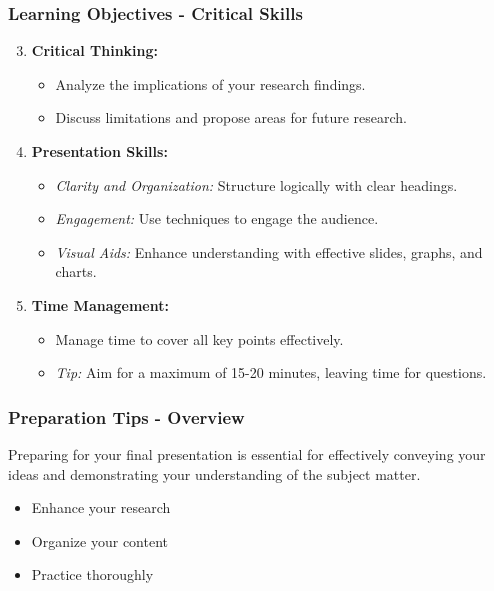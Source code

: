 \documentclass[aspectratio=169]{beamer}
\begin{document}
\begin{frame}[fragile]
    \frametitle{Learning Objectives - Critical Skills}
    \begin{enumerate}
        \setcounter{enumi}{2} %
        \item \textbf{Critical Thinking:}
        \begin{itemize}
            \item Analyze the implications of your research findings.
            \item Discuss limitations and propose areas for future research.
        \end{itemize}

        \item \textbf{Presentation Skills:}
        \begin{itemize}
            \item \textit{Clarity and Organization:} Structure logically with clear headings.
            \item \textit{Engagement:} Use techniques to engage the audience.
            \item \textit{Visual Aids:} Enhance understanding with effective slides, graphs, and charts.
        \end{itemize}
        
        \item \textbf{Time Management:}
        \begin{itemize}
            \item Manage time to cover all key points effectively.
            \item \textit{Tip:} Aim for a maximum of 15-20 minutes, leaving time for questions.
        \end{itemize}
    \end{enumerate}
\end{frame}

\begin{frame}[fragile]
    \frametitle{Preparation Tips - Overview}
    Preparing for your final presentation is essential for effectively conveying your ideas and demonstrating your understanding of the subject matter. 
    \begin{itemize}
        \item Enhance your research
        \item Organize your content
        \item Practice thoroughly
    \end{itemize}
\end{frame}
\end{document}
